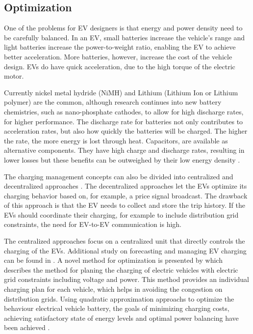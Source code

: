 \subsection{Optimization}

One of the problems for EV designers is that energy and power density need to be carefully balanced. In an EV, small batteries increase the vehicle’s range and light batteries increase the power-to-weight ratio, enabling the EV to achieve better acceleration. More batteries, however, increase the cost of the vehicle design. EVs do have quick acceleration, due to the high torque of the electric motor.

Currently nickel metal hydride (NiMH) and Lithium (Lithium Ion or Lithium polymer) are the common, although research continues into new battery chemistries, such as nano-phosphate cathodes, to allow for high discharge rates, for higher performance. The discharge rate for batteries not only contributes to acceleration rates, but also how quickly the batteries will be charged. The higher the rate, the more energy is lost through heat. Capacitors, are available as alternative components. They have high charge and discharge rates, resulting in lower losses but these benefits can be outweighed by their low energy density \cite{ZS_coi}.

The charging management concepts can also be divided into
centralized and decentralized approaches \cite{ZS_war}. The decentralized
approaches let the EVs optimize its charging behavior
based on, for example, a price signal broadcast. The drawback
of this approach is that the EV needs to collect and store the
trip history. If the EVs should coordinate their charging, for
example to include distribution grid constraints, the need for
EV-to-EV communication is high. 

The centralized approaches
focus on a centralized unit that directly controls the charging of
the EVs. Additional study on forecasting and managing EV
charging can be found in \cite{ZS_rah,ZS_gal}. A novel method for optimization is presented by \cite{ZS_sun} which describes the method for planing the charging of electric vehicles with electric grid constraints including voltage and power. This method provides an individual charging plan for each vehicle, which helps in avoiding the congestion on distribution grids. Using quadratic approximation approachs to optimize the behaviour  electrical vehicle battery, the goals of minimizing charging costs, achieving satisfactory state of energy levels and optimal power balancing have been achieved \cite{ZS_sun2}.

